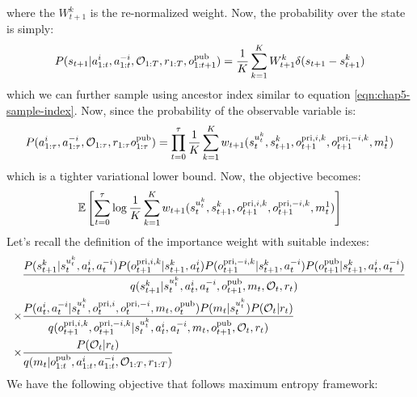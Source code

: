 where the $W^k_{t+1}$ is the re-normalized weight. Now, the probability over the state is simply:
\begin{equation}
    P(s_{t+1} | a^{i}_{1:t}, a^{-i}_{1:t}, \mathcal{O}_{1:T}, r_{1:T}, o^{\operatorname{pub}}_{1:t+1}) = \frac{1}{K}\sum^K_{k=1} W^k_{t+1} \delta (s_{t+1} - s_{t+1}^k)
\end{equation}
which we can further sample using ancestor index similar to equation \ref{eqn:chap5-sample-index}. Now, since the probability of the observable variable is:
\begin{equation}
    P(a^{i}_{1:\tau}, a^{-i}_{1:\tau}, \mathcal{O}_{1:\tau}, r_{1:\tau} o^{\operatorname{pub}}_{1:\tau}) = \prod^\tau_{t=0}\frac{1}{K}\sum^K_{k=1} w_{t+1}(s_t^{u^k_t}, s_{t+1}^k, o^{\operatorname{pri}, i, k}_{t+1}, o^{\operatorname{pri}, -i, k}_{t+1}, m_t^1)
\end{equation}
which is a tighter variational lower bound. Now, the objective becomes:
\begin{equation}
    \mathbb{E}\left[ \sum^\tau_{t=0} \log \frac{1}{K} \sum ^K_{k=1} w_{t+1}(s_t^{u^k_t}, s_{t+1}^k, o^{\operatorname{pri}, i, k}_{t+1}, o^{\operatorname{pri}, -i, k}_{t+1}, m_t^1) \right]
\end{equation}
Let's recall the definition of the importance weight with suitable indexes:
\begin{equation}
\begin{aligned}
    &\frac{P(s_{t+1}^k | s_t^{u^k_t}, a_t^i, a_t^{-i})P(o^{\operatorname{pri}, i, k}_{t+1} | s_{t+1}^k, a^i_t) P(o^{\operatorname{pri}, -i, k}_{t+1} | s_{t+1}^k, a^{-i}_t) P(o^{\operatorname{pub}}_{t+1} | s_{t+1}^k, a^i_t, a^{-i}_t)}{q(s_{t+1}^k | s_t^{u^k_t}, a^i_t, a^{-i}_t, o^{\operatorname{pub}}_{t+1}, m_t, \mathcal{O}_t, r_t)} \\
    \times&\frac{P(a^i_t, a^{-i}_t | s_t^{u^k_t}, o^{\operatorname{pri}, i}_t, o^{\operatorname{pri}, -i}_t, m_t, o^{\operatorname{pub}}_t) P(m_t | s_t^{u^k_t}) P(\mathcal{O}_t | r_t)}{q(o^{\operatorname{pri}, i, k}_{t+1}, o^{\operatorname{pri}, -i, k}_{t+1} | s_t^{u^k_t}, a^i_t, a^{-i}_t, m_t, o^{\operatorname{pub}}_{t+1}, \mathcal{O}_t, r_t)} \\
    \times&\frac{P(\mathcal{O}_t | r_t)}{q(m_t | o^{\operatorname{pub}}_{1:t}, a^{i}_{1:t}, a^{-i}_{1:t}, \mathcal{O}_{1:T}, r_{1:T})}
\end{aligned}
\end{equation}
We have the following objective that follows maximum entropy framework:
